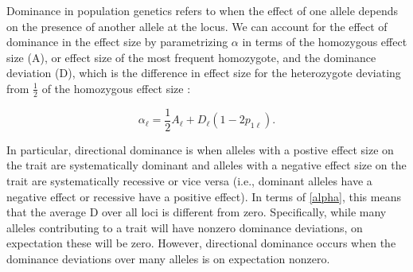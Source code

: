\documentclass[a4paper,12pt]{article}
\begin{document}

Dominance in population genetics refers to when the effect of one
allele depends on the presence of another allele at the locus. We can account for
the effect of dominance in the effect size by parametrizing $\alpha$
in terms of the homozygous effect size (A), or effect size of the most frequent homozygote, and the
dominance deviation (D), which is the difference in effect size for the heterozygote
deviating from $\frac{1}{2}$ of the homozygous effect size \cite{gillespie}:

\begin{equation}  
  \alpha_\ell = \frac{1}{2} A_\ell + D_\ell\left(1-2p_{1\ell}\right).
  \label{alpha}
\end{equation}

In particular, directional dominance is when alleles with a postive effect
size on the trait are systematically dominant and alleles with a
negative effect size on the trait are systematically recessive or vice
versa (i.e., dominant alleles have a negative effect or recessive have
a positive effect). In terms of \eqref{alpha}, this means that the
average D over all loci is different from zero. Specifically, while
many alleles contributing to a trait will have nonzero dominance
deviations, on expectation these will be zero. However, directional
dominance occurs when the dominance deviations over many alleles is on
expectation nonzero.
\end{document}
